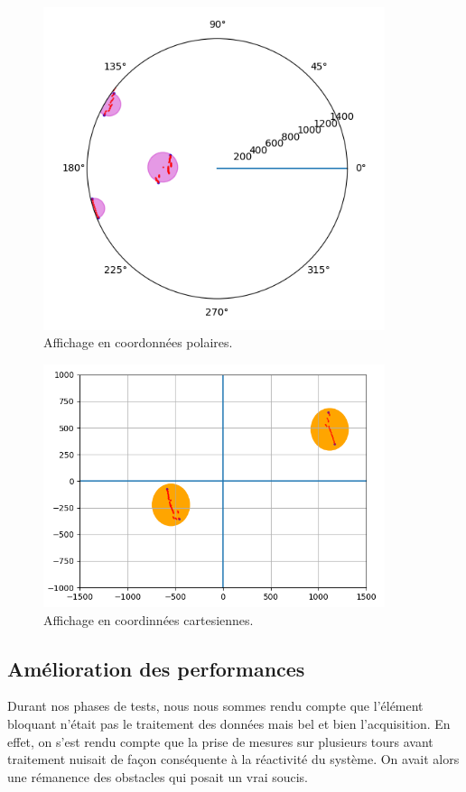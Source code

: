 \begin{figure}[htp]
    \centering
    \includegraphics[width=10cm]{images/Detection/sans_piste_ni_kalman_polaire01.png}
    \caption{Affichage en coordonnées polaires.}
\end{figure}
\begin{figure}[htp]
    \centering
    \includegraphics[width=10cm]{images/Detection/sans_piste_ni_kalman_cartesien01.png}
    \caption{Affichage en coordinnées cartesiennes.}
\end{figure}


\newpage
\subsection{Amélioration des performances}
\tab Durant nos phases de tests, nous nous sommes rendu compte que l’élément bloquant n’était pas le traitement des données mais bel et bien l’acquisition. En effet, on s'est rendu compte que la prise de mesures sur plusieurs tours avant traitement nuisait de façon conséquente à la réactivité du système. On avait alors une rémanence des obstacles qui posait un vrai soucis.

